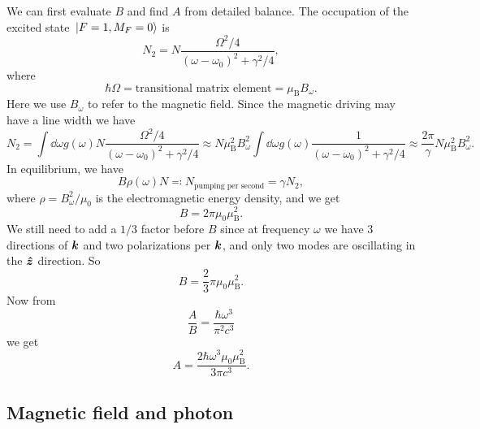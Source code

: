 \documentclass[hyperref, a4paper]{article}
\newcommand*{\muB}{\mu_{\text{B}}}
\begin{document}
We can first evaluate $B$ and find $A$ from detailed balance.
The occupation of the excited state $\ket*{F=1, M_F = 0}$ is 
\begin{equation}
    N_2 = N \frac{\Omega^2 / 4}{(\omega - \omega_0)^2 + \gamma^2 / 4},
\end{equation}
where 
\begin{equation}
    \hbar \Omega = \text{transitional matrix element} = \muB B_\omega.
\end{equation}
Here we use $B_\omega$ to refer to the magnetic field.
Since the magnetic driving may have a line width we have 
\begin{equation}
    N_2 = \int \dd{\omega} g(\omega) N \frac{\Omega^2 / 4}{(\omega - \omega_0)^2 + \gamma^2 / 4}
    \approx N \muB^2 B_\omega^2 \int \dd{\omega} g(\omega) \frac{1}{(\omega - \omega_0)^2 + \gamma^2 / 4}
    \approx \frac{2\pi}{\gamma} N \muB^2 B_\omega^2.
    \label{eq:n2}
\end{equation}
In equilibrium, we have 
\begin{equation}
    B \rho(\omega) N \eqqcolon N_{\text{pumping per second}} = \gamma N_2,
\end{equation}
where $\rho = B_\omega^2 / \mu_0$ is the electromagnetic energy density,
and we get 
\begin{equation}
    B = 2 \pi \mu_0 \muB^2.
\end{equation}
We still need to add a $1/3$ factor before $B$ 
since at frequency $\omega$ we have 3 directions of $\vb*{k}$ 
and two polarizations per $\vb*{k}$,
and only two modes are oscillating in the $\vu*{z}$ direction.
So 
\begin{equation}
    B = \frac{2}{3} \pi \mu_0 \muB^2.
\end{equation}
Now from 
\begin{equation}
    \frac{A}{B}=\frac{\hbar \omega^3}{\pi^2 c^3}
\end{equation}
we get 
\begin{equation}
    A = \frac{2 \hbar \omega^3 \mu_0 \muB^2}{3 \pi c^3}.
\end{equation}


\subsection{}

\subsection{Magnetic field and photon}
\end{document}
